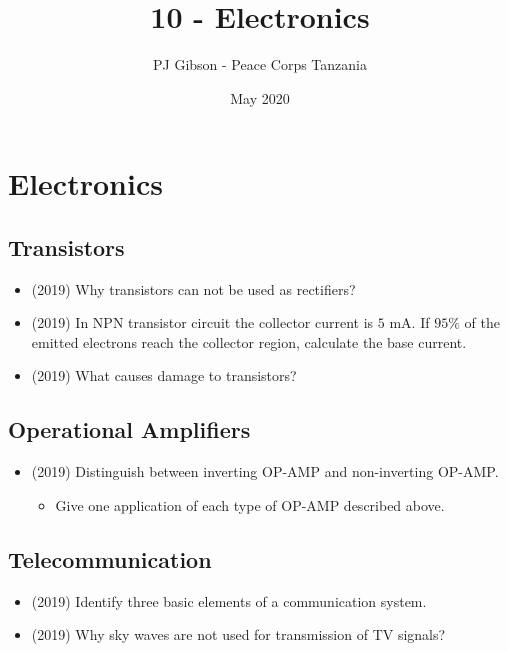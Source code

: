 \documentclass{article}
\title{10 - Electronics}
\author{PJ Gibson - Peace Corps Tanzania}
\date{May 2020}
\begin{document}
\maketitle


\section{Electronics}

\subsection{Transistors}
\begin{itemize}
\item (2019)  Why transistors can not be used as rectifiers? 
\item (2019)  In NPN transistor circuit the collector current is $ 5$ mA. If $ 95\%$ of the emitted electrons reach the collector region, calculate the base current. 
\item (2019)  What causes damage to transistors? 
\end{itemize}

\subsection{Operational Amplifiers}
\begin{itemize}
\item (2019)  Distinguish between inverting OP-AMP and non-inverting OP-AMP. 
 \begin{itemize}
\item Give one application of each type of OP-AMP described above.
\end{itemize}
\end{itemize}

\subsection{Telecommunication}
\begin{itemize}
\item (2019)  Identify three basic elements of a communication system. 
\item (2019)  Why sky waves are not used for transmission of TV signals? 
\end{itemize}
\end{document}
